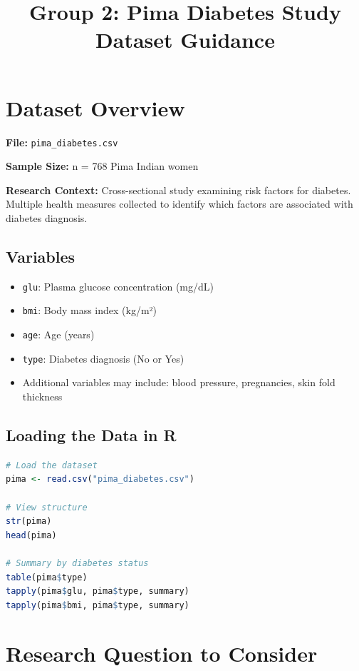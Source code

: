 \documentclass[11pt]{article}
\title{\textbf{Group 2: Pima Diabetes Study}\\
\large{Dataset Guidance}}
\author{}
\date{}
\begin{document}
\maketitle

\section*{Dataset Overview}

\textbf{File:} \texttt{pima\_diabetes.csv}

\textbf{Sample Size:} n = 768 Pima Indian women

\textbf{Research Context:} Cross-sectional study examining risk factors for diabetes. Multiple health measures collected to identify which factors are associated with diabetes diagnosis.

\subsection*{Variables}

\begin{itemize}
\item \texttt{glu}: Plasma glucose concentration (mg/dL)
\item \texttt{bmi}: Body mass index (kg/m²)
\item \texttt{age}: Age (years)
\item \texttt{type}: Diabetes diagnosis (No or Yes)
\item Additional variables may include: blood pressure, pregnancies, skin fold thickness
\end{itemize}

\subsection*{Loading the Data in R}

\begin{lstlisting}[language=R, basicstyle=\small\ttfamily, breaklines=true]
# Load the dataset
pima <- read.csv("pima_diabetes.csv")

# View structure
str(pima)
head(pima)

# Summary by diabetes status
table(pima$type)
tapply(pima$glu, pima$type, summary)
tapply(pima$bmi, pima$type, summary)
\end{lstlisting}

\section*{Research Question to Consider}
\end{document}
